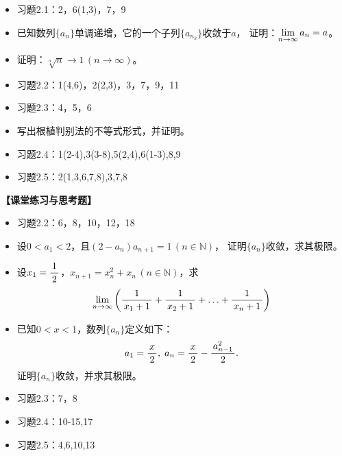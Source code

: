 \begin{itemize}
  \item 习题2.1：2，6(1,3)，7，9
  \item 已知数列$\{a_n\}$单调递增，它的一个子列$\{a_{n_k}\}$收敛于$a$，
  证明：$\lim\limits_{n\to\infty} a_n=a$。
  \item 证明：$\sqrt[n]n\to 1\,(n\to\infty)$。
  \item 习题2.2：1(4,6)，2(2,3)，3，7，9，11
  \item 习题2.3：4，5，6
  \item 写出根植判别法的不等式形式，并证明。
  \item 习题2.4：1(2-4),3(3-8),5(2,4),6(1-3),8,9
  \item 习题2.5：2(1,3,6,7,8),3,7,8
\end{itemize}

{\bf 【课堂练习与思考题】}

\begin{itemize}
  \item 习题2.2：6，8，10，12，18
  \item 设$0<a_1<2$，且$(2-a_n)a_{n+1}=1\,(n\in\mathbb{N})$，
  	证明$\{a_n\}$收敛，求其极限。
  \item 设$x_1=\displaystyle\frac{\,{1}\,}{\,{2}\,}$，$x_{n+1}=x_n^2+x_n\,(n\in\mathbb{N})$，求
	$$\lim\limits_{n\to\infty}\left(\displaystyle\frac{\,{1}\,}{\,{x_1+1}\,}+\displaystyle\frac{\,{1}\,}{\,{x_2+1}\,}+\ldots+\displaystyle\frac{\,{1}\,}{\,{x_n+1}\,}\right)$$
  \item 已知$0<x<1$，数列$\{a_n\}$定义如下：
	$$a_1=\displaystyle\frac{\,{x}\,}{\,{2}\,},\;a_n=\displaystyle\frac{\,{x}\,}{\,{2}\,}-\displaystyle\frac{\,{a_{n-1}^2}\,}{\,{2}\,}.$$
	证明$\{a_n\}$收敛，并求其极限。
  \item 习题2.3：7，8 
  \item 习题2.4：10-15,17
  \item 习题2.5：4,6,10,13
\end{itemize}